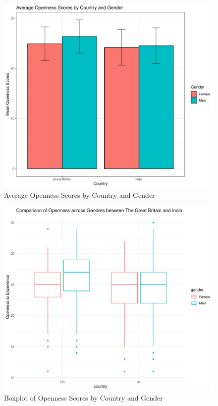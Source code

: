 \documentclass[
  english,
  man]{apa6}
\begin{document}
\begin{figure}
\centering
\includegraphics{final_project_files/figure-latex/barplot-1.pdf}
\caption{\label{fig:barplot}Average Openness Scores by Country and Gender}
\end{figure}

\begin{figure}
\centering
\includegraphics{final_project_files/figure-latex/boxplot-1.pdf}
\caption{\label{fig:boxplot}Boxplot of Openness Scores by Country and Gender}
\end{figure}
\end{document}
